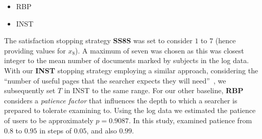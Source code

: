 \begin{itemize}
    \item[\blueboxbold{SS12}] RBP
\end{itemize}

\begin{itemize}
    \item[\blueboxbold{SS13}] INST
\end{itemize}

The satisfaction stopping strategy \textbf{SS8S} was set to consider $1$ to $7$ (hence providing values for $x_8$). A maximum of seven was chosen as this was closest integer to the mean number of documents marked by subjects in the log data. With our \textbf{INST} stopping strategy employing a similar approach, considering the ``number of useful pages that the searcher expects they will need''~\cite{moffat2015inst}, we subsequently set $T$ in INST to the same range. For our other baseline, \textbf{RBP} considers a \emph{patience factor} that influences the depth to which a searcher is prepared to tolerate examining to. Using the log data we estimated the patience of users to be approximately $p=0.9087$. In this study, examined patience from $0.8$ to $0.95$ in steps of $0.05$, and also $0.99$.